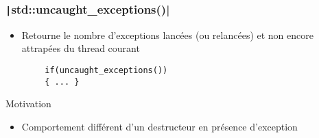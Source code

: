 \documentclass[C++.tex]{subfiles}
\begin{document}
\begin{frame}[fragile]
	\frametitle{\texttt|std::uncaught_exceptions()|}
	\begin{itemize}
		\item Retourne le nombre d'exceptions lancées (ou relancées) et non encore attrapées du thread courant
	\end{itemize}

	\begin{verbatim}
		if(uncaught_exceptions())
		{ ... }
	\end{verbatim}

	\begin{block}{Motivation}
		\begin{itemize}
			\item Comportement différent d'un destructeur en présence d'exception
		\end{itemize}
	\end{block}


\end{frame}
\end{document}
